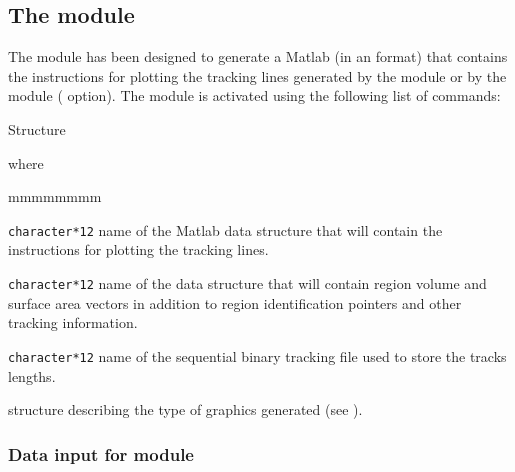 \subsection{The  module}\label{sect:TLMData}

The  module has been designed to generate a Matlab  (in an  format) that contains the instructions for
plotting the tracking lines generated by the  module or by the  module ( option).\cite{Plamondon2006}
The  module is activated using the following list of commands:

\begin{DataStructure}{Structure }
 \moc{:=}      
\moc{::} 
\end{DataStructure}

\noindent
 where

\begin{ListeDeDescription}{mmmmmmmm}

\item[\dusa{MFILE}] \verb|character*12| name of the  Matlab  data structure that
will contain the instructions for plotting the tracking lines.

\item[\dusa{TRKNAM}] \verb|character*12| name of the  data structure that
will contain region volume and surface area vectors in addition to region
identification pointers and other tracking information.

\item[\dusa{TRKFIL}] \verb|character*12| name of the sequential binary tracking file 
used to store the tracks lengths.\cite{Marleau2001}  

\item[\dstr{desctlm}] structure describing the type of graphics generated (see ).

\end{ListeDeDescription}

\subsubsection{Data input for module }\label{sect:desctlm}

